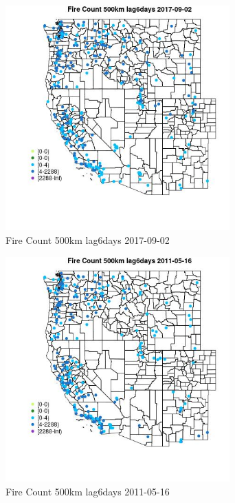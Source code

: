 \begin{figure} 
\centering  
\includegraphics[width=0.77\textwidth]{Code_Outputs/Report_ML_input_PM25_Step4_part_e_de_duplicated_aves_compiled_2019-05-20wNAs_MapObsFire_Count_500km_lag6days2017-09-02.jpg} 
\caption{\label{fig:Report_ML_input_PM25_Step4_part_e_de_duplicated_aves_compiled_2019-05-20wNAsMapObsFire_Count_500km_lag6days2017-09-02}Fire Count 500km lag6days 2017-09-02} 
\end{figure} 
 

\begin{figure} 
\centering  
\includegraphics[width=0.77\textwidth]{Code_Outputs/Report_ML_input_PM25_Step4_part_e_de_duplicated_aves_compiled_2019-05-20wNAs_MapObsFire_Count_500km_lag6days2011-05-16.jpg} 
\caption{\label{fig:Report_ML_input_PM25_Step4_part_e_de_duplicated_aves_compiled_2019-05-20wNAsMapObsFire_Count_500km_lag6days2011-05-16}Fire Count 500km lag6days 2011-05-16} 
\end{figure} 
 


